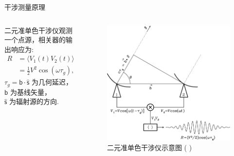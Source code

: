\documentclass{beamer}
\newcommand{\B}[1]{\bm{\mathsf{#1}}}  %
\newcommand{\citeay}[1]{\citeauthor{#1} \citeyear{#1} \parencite{#1}}
\begin{document}
\begin{frame}{干涉测量原理}
  \begin{columns}
    二元准单色干涉仪观测一个点源，相关器的输出响应为:
    \begin{align}
      R & = \langle V_1(t) V_2(t) \rangle \\
        & = \frac{1}{2} V^2 \cos (\omega \tau_g) ,
    \end{align}
    $\tau_g = \B{b} \cdot \hat{\B{s}}$ 为几何延迟，\\
    $\B{b}$ 为基线矢量，\\
    $\hat{\B{s}}$ 为辐射源的方向.

    \begin{figure}
      \centering
      \includegraphics[width=\columnwidth]{interferometer}
      \caption{二元准单色干涉仪示意图 (\citeay{condon2016})}
    \end{figure}
  \end{columns}
\end{frame}
\end{document}
